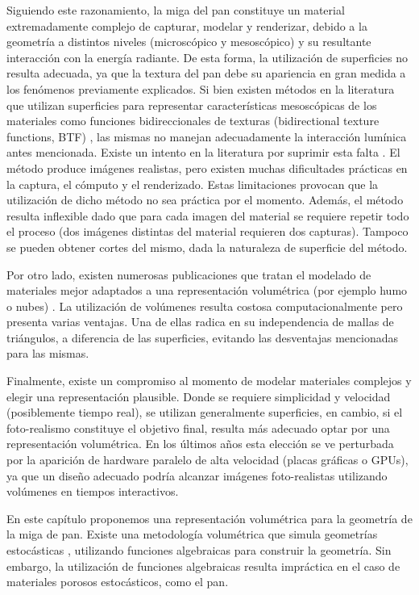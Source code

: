 Siguiendo este razonamiento, la miga del pan constituye un material extremadamente complejo de capturar, modelar y renderizar, debido a la geometría a distintos niveles (microscópico y mesoscópico) y su resultante interacción con la energía radiante.
De esta forma, la utilización de superficies no resulta adecuada, ya que la textura del pan debe su apariencia en gran medida a los fenómenos previamente explicados.
Si bien existen métodos en la literatura que utilizan superficies para representar características mesoscópicas de los materiales como funciones bidireccionales de texturas (bidirectional texture functions, \acrshort{BTF}) \cite{Tong2002}, las mismas no manejan adecuadamente la interacción lumínica antes mencionada.
Existe un intento en la literatura por suprimir esta falta \cite{Tong2005}.
El método produce imágenes realistas, pero existen muchas dificultades prácticas en la captura, el cómputo y el renderizado.
Estas limitaciones provocan que la utilización de dicho método no sea práctica por el momento.
Además, el método resulta inflexible dado que para cada imagen del material se requiere repetir todo el proceso (dos imágenes distintas del material requieren dos capturas).
Tampoco se pueden obtener cortes del mismo, dada la naturaleza de superficie del método.

Por otro lado, existen numerosas publicaciones que tratan el modelado de materiales mejor adaptados a una representación volumétrica (por ejemplo humo o nubes) \cite{Chentanez2011,Zhou2008}.
La utilización de volúmenes resulta costosa computacionalmente pero presenta varias ventajas.
Una de ellas radica en su independencia de mallas de triángulos, a diferencia de las superficies, evitando las desventajas mencionadas para las mismas.

Finalmente, existe un compromiso al momento de modelar materiales complejos y elegir una representación plausible.
Donde se requiere simplicidad y velocidad (posiblemente tiempo real), se utilizan generalmente superficies, en cambio, si el foto-realismo constituye el objetivo final, resulta más adecuado optar por una representación volumétrica.
En los últimos años esta elección se ve perturbada por la aparición de hardware paralelo de alta velocidad (placas gráficas o GPUs), ya que un diseño adecuado podría alcanzar imágenes foto-realistas utilizando volúmenes en tiempos interactivos.

En este capítulo proponemos una representación volumétrica para la geometría de la miga de pan.
Existe una metodología volumétrica que simula geometrías estocásticas \cite{Perlin1989}, utilizando funciones algebraicas para construir la geometría.
Sin embargo, la utilización de funciones algebraicas resulta impráctica en el caso de materiales porosos estocásticos, como el pan.

